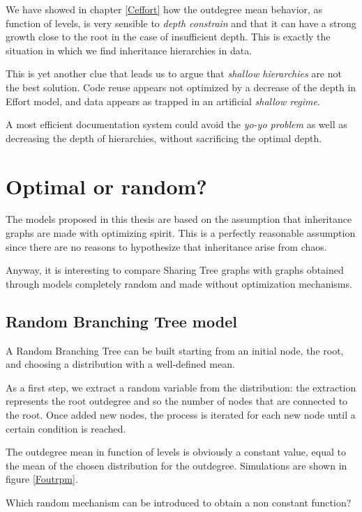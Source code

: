 We have showed in chapter \ref{Ceffort} how the outdegree mean behavior, as function of levels, is very sensible to \textit{depth constrain} and that it can have a strong growth close to the root in the case of insufficient depth. This is exactly the situation in which we find inheritance hierarchies in data.

This is yet another clue that leads us to argue that \textit{shallow hierarchies} are not the best solution. Code reuse appears not optimized by a decrease of the depth in Effort model, and data appears as trapped in an artificial \textit{shallow regime}.

A most efficient documentation system could avoid the \textit{yo-yo problem} as well as decreasing the depth of hierarchies, without sacrificing the optimal depth.

\section{Optimal or random?}
The models proposed in this thesis are based on the assumption that inheritance graphs are made with optimizing spirit. This is a perfectly reasonable assumption since there are no reasons to hypothesize that inheritance arise from chaos.

Anyway, it is interesting to compare Sharing Tree graphs with graphs obtained through models completely random and made without optimization mechanisms.

\subsection{Random Branching Tree model}
A Random Branching Tree can be built starting from an initial node, the root, and choosing a distribution with a well-defined mean.

As a first step, we extract a random variable from the distribution: the extraction represents the root outdegree and so the number of nodes that are connected to the root. Once added new nodes, the process is iterated for each new node until a certain condition is reached.

The outdegree mean in function of levels is obviously a constant value, equal to the mean of the chosen distribution for the outdegree. Simulations are shown in figure \ref{Foutrpm}.

Which random mechanism can be introduced to obtain a non constant function? 

